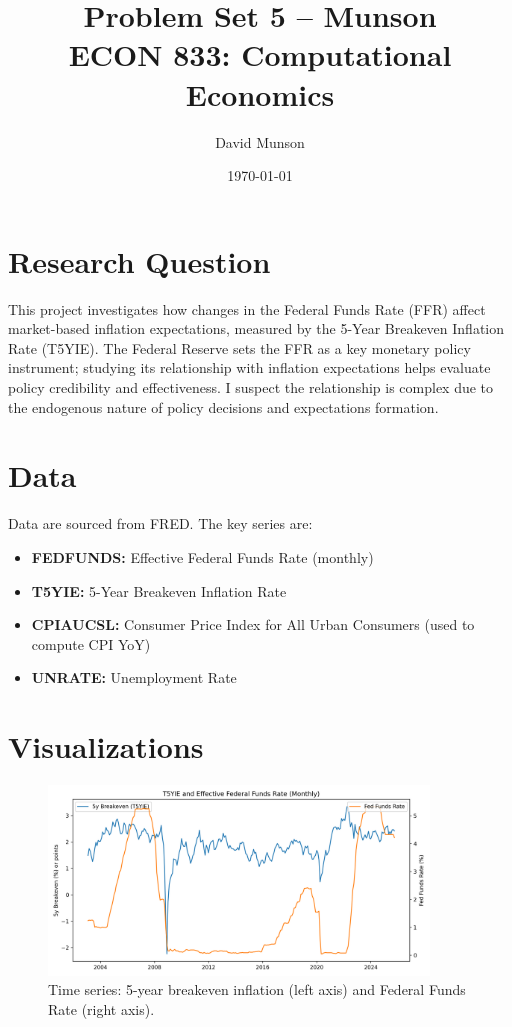 \documentclass[11pt]{article}
\title{Problem Set 5 -- Munson \\ ECON 833: Computational Economics}
\author{David Munson}
\date{\today}
\begin{document}
\maketitle

\section{Research Question}
This project investigates how changes in the Federal Funds Rate (FFR) affect market-based inflation expectations, measured by the 5-Year Breakeven Inflation Rate (T5YIE). The Federal Reserve sets the FFR as a key monetary policy instrument; studying its relationship with inflation expectations helps evaluate policy credibility and effectiveness.  I suspect the relationship is complex due to the endogenous nature of policy decisions and expectations formation.

\section{Data}
Data are sourced from FRED. The key series are:
\begin{itemize}
  \item \textbf{FEDFUNDS:} Effective Federal Funds Rate (monthly)
  \item \textbf{T5YIE:} 5-Year Breakeven Inflation Rate
  \item \textbf{CPIAUCSL:} Consumer Price Index for All Urban Consumers (used to compute CPI YoY)
  \item \textbf{UNRATE:} Unemployment Rate
\end{itemize}

\section{Visualizations}
\begin{figure}[H]
  \centering
  \includegraphics[width=0.9\textwidth]{images/fig1_timeseries.png}
  \caption{Time series: 5-year breakeven inflation (left axis) and Federal Funds Rate (right axis).}
\end{figure}
\end{document}
